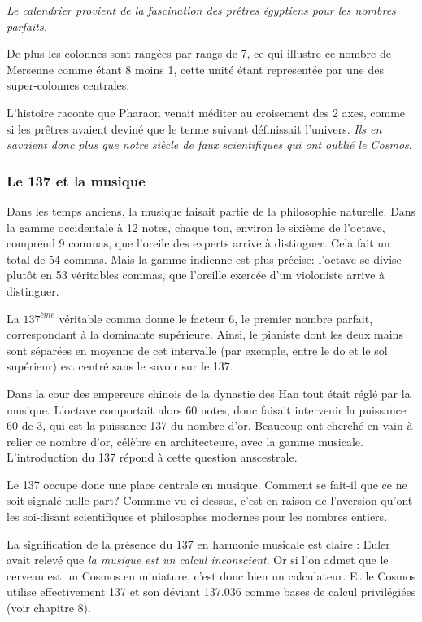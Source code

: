 \documentclass[a4paper,12pt]{article}
\begin{document}
      \textit{Le calendrier provient de la fascination des prêtres égyptiens pour les nombres parfaits.}
      

      De plus les colonnes sont rangées par rangs de 7, ce qui illustre ce nombre de Mersenne comme étant 8 moins 1, cette unité étant representée par une des super-colonnes centrales.
      

L'histoire raconte que Pharaon venait méditer au croisement des 2 axes, comme si les prêtres avaient deviné que le terme suivant définissait l'univers. \textit{Ils en savaient donc plus que notre siècle de faux scientifiques qui ont oublié le Cosmos}.


\subsubsection{Le 137 et la musique}

Dans les temps anciens, la musique faisait partie de la philosophie naturelle. Dans la gamme occidentale à 12 notes, chaque ton, environ le sixième de l'octave, comprend 9 commas, que l'oreile des experts arrive à distinguer. Cela fait un total de 54 commas. Mais la gamme indienne est plus précise: l'octave se divise plutôt en 53 véritables commas, que l'oreille exercée d'un violoniste arrive à distinguer. 


La $137^{ème}$ véritable comma donne le facteur 6, le premier nombre parfait, correspondant à la dominante supérieure. Ainsi, le pianiste dont les deux mains sont séparées en moyenne de cet intervalle (par exemple, entre le do et le sol supérieur) est centré sans le savoir sur le 137.


Dans la cour des empereurs chinois de la dynastie des Han tout était réglé par la musique. L'octave comportait alors 60 notes, donc faisait intervenir la puissance 60 de 3, qui est la puissance 137 du nombre d'or. Beaucoup ont cherché en vain à relier ce nombre d'or, célèbre en architecteure, avec la gamme musicale. L'introduction du 137 répond à cette question anscestrale.


Le 137 occupe donc une place centrale en musique. Comment se fait-il que ce ne soit signalé nulle part? Commme vu ci-dessus, c'est en raison de l'aversion qu'ont les soi-disant scientifiques et philosophes modernes pour les nombres entiers. 


La signification de la présence du 137 en harmonie musicale est claire : Euler avait relevé que \textit{la musique est un calcul inconscient}. Or si l'on admet que le cerveau est un Cosmos en miniature, c'est donc bien un calculateur. Et le Cosmos utilise effectivement 137 et son déviant 137.036 comme bases de calcul privilégiées (voir chapitre 8).
   
\end{document}
